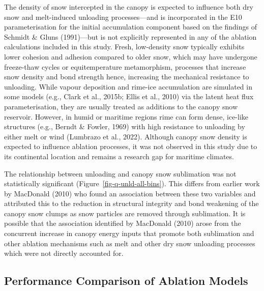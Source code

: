 \documentclass[
  letterpaper,
]{tex/uofsthesis-cs}
\begin{document}
The density of snow intercepted in the canopy is expected to influence
both dry snow and melt-induced unloading processes---and is incorporated
in the E10 parameterisation for the initial accumulation component based
on the findings of Schmidt \& Gluns (1991)---but is not explicitly
represented in any of the ablation calculations included in this study.
Fresh, low-density snow typically exhibits lower cohesion and adhesion
compared to older snow, which may have undergone freeze-thaw cycles or
equitemperature metamorphism, processes that increase snow density and
bond strength hence, increasing the mechanical resistance to unloading.
While vapour deposition and rime-ice accumulation are simulated in some
models (e.g., Clark et al., 2015b; Ellis et al., 2010) via the latent
heat flux parameterisation, they are usually treated as additions to the
canopy snow reservoir. However, in humid or maritime regions rime can
form dense, ice-like structures (e.g., Berndt \& Fowler, 1969) with high
resistance to unloading by either melt or wind (Lumbrazo et al., 2022).
Although canopy snow density is expected to influence ablation
processes, it was not observed in this study due to its continental
location and remains a research gap for maritime climates.

The relationship between unloading and canopy snow sublimation was not
statistically significant (Figure~\ref{fig-q-unld-all-bins}). This
differs from earlier work by MacDonald (2010) who found an association
between these two variables and attributed this to the reduction in
structural integrity and bond weakening of the canopy snow clumps as
snow particles are removed through sublimation. It is possible that the
association identified by MacDonald (2010) arose from the concurrent
increase in canopy energy inputs that promote both sublimation and other
ablation mechanisms such as melt and other dry snow unloading processes
which were not directly accounted for.

\subsection{Performance Comparison of Ablation
Models}\label{performance-comparison-of-ablation-models}
\end{document}
